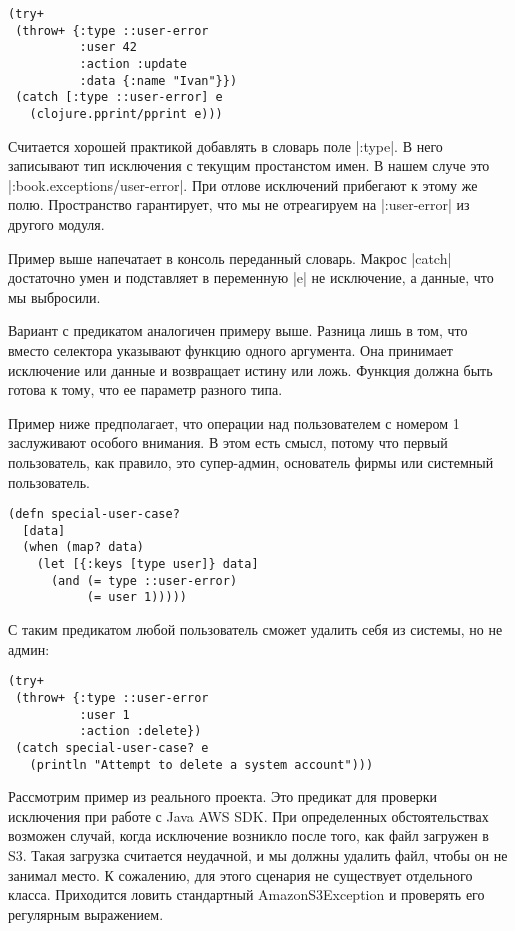 \begin{verbatim}
(try+
 (throw+ {:type ::user-error
          :user 42
          :action :update
          :data {:name "Ivan"}})
 (catch [:type ::user-error] e
   (clojure.pprint/pprint e)))
\end{verbatim}

Считается хорошей практикой добавлять в словарь поле \spverb|:type|. В него записывают
тип исключения с текущим простанстом имен. В нашем случе это
\spverb|:book.exceptions/user-error|. При отлове исключений прибегают к этому же
полю. Пространство гарантирует, что мы не отреагируем на \spverb|:user-error| из
другого модуля.

Пример выше напечатает в консоль переданный словарь. Макрос \spverb|catch| достаточно
умен и подставляет в переменную \spverb|e| не исключение, а данные, что мы выбросили.

Вариант с предикатом аналогичен примеру выше. Разница лишь в том, что вместо
селектора указывают функцию одного аргумента. Она принимает исключение или
данные и возвращает истину или ложь. Функция должна быть готова к тому, что ее
параметр разного типа.

Пример ниже предполагает, что операции над пользователем с номером 1 заслуживают
особого внимания. В этом есть смысл, потому что первый пользователь, как
правило, это супер-админ, основатель фирмы или системный пользователь.

\begin{verbatim}
(defn special-user-case?
  [data]
  (when (map? data)
    (let [{:keys [type user]} data]
      (and (= type ::user-error)
           (= user 1)))))
\end{verbatim}

С таким предикатом любой пользователь сможет удалить себя из системы, но не
админ:

\begin{verbatim}
(try+
 (throw+ {:type ::user-error
          :user 1
          :action :delete})
 (catch special-user-case? e
   (println "Attempt to delete a system account")))
\end{verbatim}

Рассмотрим пример из реального проекта. Это предикат для проверки исключения при
работе с Java AWS SDK. При определенных обстоятельствах возможен случай, когда
исключение возникло после того, как файл загружен в S3. Такая загрузка считается
неудачной, и мы должны удалить файл, чтобы он не занимал место. К сожалению, для
этого сценария не существует отдельного класса. Приходится ловить стандартный
AmazonS3Exception и проверять его регулярным выражением.

